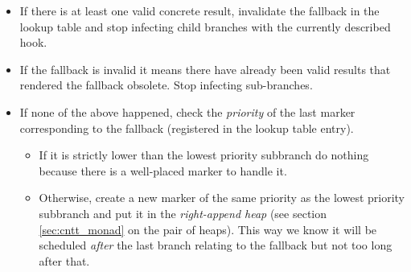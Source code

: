 \begin{itemize}
\item If there is at least one valid concrete result, invalidate the
  fallback in the lookup table and stop infecting child branches with
  the currently described hook.
\item If the fallback is invalid it means there have already been
  valid results that rendered the fallback obsolete. Stop infecting
  sub-branches.
\item If none of the above happened, check the \emph{priority} of the
  last marker corresponding to the fallback (registered in the lookup
  table entry).

  \begin{itemize}
  \item If it is strictly lower than the lowest priority
    subbranch do nothing because there is a well-placed marker to handle
    it.
  \item Otherwise, create a new marker of the same priority as the
    lowest priority subbranch and put it in the \emph{right-append
    heap} (see section \ref{sec:cntt_monad} on the pair of
    heaps). This way we know it will be scheduled \emph{after} the
    last branch relating to the fallback but not too long after that.
  \end{itemize}


\end{itemize}

